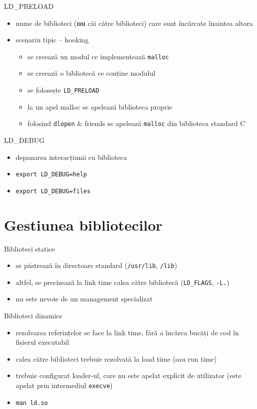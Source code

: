 \documentclass{beamer}
\begin{document}
\begin{frame}{LD\_PRELOAD}
  \begin{itemize}
    \item nume de biblioteci (\textbf{nu} căi către biblioteci) care sunt
    încărcate înaintea altora
    \item scenariu tipic -- hooking
      \begin{itemize}
        \item se creează un modul ce implementează \texttt{malloc}
        \item se creează o bibliotecă ce conține modulul
        \item se folosește \texttt{LD\_PRELOAD}
        \item la un apel malloc se apelează biblioteca proprie
        \item folosind \texttt{dlopen} \& friends se apelează \texttt{malloc}
        din biblioteca standard C
      \end{itemize}
  \end{itemize}
\end{frame}

\begin{frame}{LD\_DEBUG}
  \begin{itemize}
    \item depanarea interacțiunii cu biblioteca
    \item \texttt{export LD\_DEBUG=help}
    \item \texttt{export LD\_DEBUG=files}
  \end{itemize}
\end{frame}

\section{Gestiunea bibliotecilor}

\begin{frame}{Biblioteci statice}
  \begin{itemize}
    \item se păstrează în directoare standard (\texttt{/usr/lib},
    \texttt{/lib})
    \item altfel, se precizează la link time calea către bibliotecă
    (\texttt{LD\_FLAGS}, \texttt{-L.})
    \item nu este nevoie de un management specializat
  \end{itemize}
\end{frame}

\begin{frame}{Biblioteci dinamice}
  \begin{itemize}
    \item rezolvarea referințelor se face la link time, fără a încărca bucăți
    de cod în fișierul executabil
    \item calea către biblioteci trebuie rezolvată la load time (sau run time)
    \item trebuie configurat loader-ul, care nu este apelat explicit de
    utilizator (este apelat prin intermediul \texttt{execve})
    \item \texttt{man ld.so}
  \end{itemize}
\end{frame}
\end{document}
